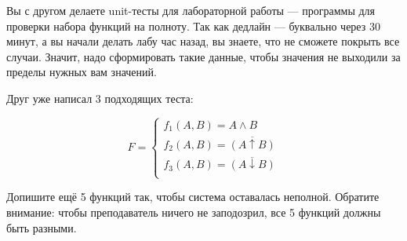\question
Вы с другом делаете unit-тесты для лабораторной работы — программы для проверки набора функций на полноту. Так как дедлайн — буквально через 30 минут, а вы начали делать лабу час назад, вы знаете, что не сможете покрыть все случаи. Значит, надо сформировать такие данные, чтобы значения не выходили за пределы нужных вам значений.

Друг уже написал 3 подходящих теста:

\begin{equation*}
    F=
    \begin{cases}
        f_1(A,B)=A \land B\\
        f_2(A,B)=\overline{(A \uparrow B)}\\
        f_3(A,B)=\overline{(A \downarrow B)}\\
    \end{cases}
\end{equation*}
    
Допишите ещё 5 функций так, чтобы система оставалась неполной. Обратите внимание: чтобы преподаватель ничего не заподозрил, все 5 функций должны быть разными.